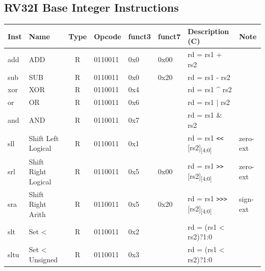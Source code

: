 \subsection*{RV32I Base Integer Instructions}

\begin{tabular}
{T | l | c | T | T | T | T | l} \hline
\rm Inst & Name                       & Type  & \rm Opcode & \rm funct3 & \rm funct7                     & \rm Description (C)                                          & Note     \\ \hline
add      & ADD                        & R     & 0110011    & 0x0        & 0x00                           & rd = rs1 + rs2                                               &          \\
sub      & SUB                        & R     & 0110011    & 0x0        & 0x20                           & rd = rs1 - rs2                                               &          \\
xor      & XOR                        & R     & 0110011    & 0x4        &                                & rd = rs1 \^{} rs2                                            &          \\
or       & OR                         & R     & 0110011    & 0x6        &                                & rd = rs1 | rs2                                               &          \\
and      & AND                        & R     & 0110011    & 0x7        &                                & rd = rs1 \& rs2                                              &          \\
sll      & Shift Left Logical         & R     & 0110011    & 0x1        &                                & rd = rs1 \verb|<<| [rs2]\textsubscript{[4:0]}                & zero-ext \\
srl      & Shift Right Logical        & R     & 0110011    & 0x5        & 0x00                           & rd = rs1 \verb|>>| [rs2]\textsubscript{[4:0]}                & zero-ext \\
sra      & Shift Right Arith          & R     & 0110011    & 0x5        & 0x20                           & rd = rs1 \verb|>>>| [rs2]\textsubscript{[4:0]}               & sign-ext \\
slt      & Set <                      & R     & 0110011    & 0x2        &                                & rd = (rs1 < rs2)?1:0                                         &          \\
sltu     & Set < Unsigned             & R     & 0110011    & 0x3        &                                & rd = (rs1 < rs2)?1:0                                         &          \\ \hline

\end{tabular}
